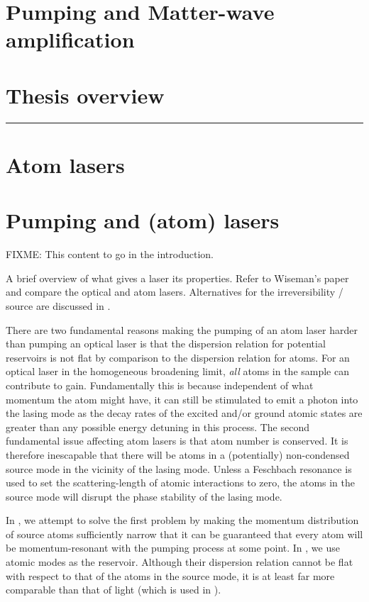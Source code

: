 \section{Pumping and Matter-wave amplification}

\section{Thesis overview}

\hrule

\section{Atom lasers}
\label{Introduction:AtomLaser}


\section{Pumping and (atom) lasers}
\label{Introduction:Pumping}

FIXME: This content to go in the introduction.

A brief overview of what gives a laser its properties. Refer to Wiseman's paper~\citep{Wiseman:1997ba} and compare the optical and atom lasers. Alternatives for the irreversibility / source are discussed in .

There are two fundamental reasons making the pumping of an atom laser harder than pumping an optical laser is that the dispersion relation for potential reservoirs is not flat by comparison to the dispersion relation for atoms.  For an optical laser in the homogeneous broadening limit, \emph{all} atoms in the sample can contribute to gain.  Fundamentally this is because independent of what momentum the atom might have, it can still be stimulated to emit a photon into the lasing mode as the decay rates of the excited and/or ground atomic states are greater than any possible energy detuning in this process.  The second fundamental issue affecting atom lasers is that atom number is conserved.  It is therefore inescapable that there will be atoms in a (potentially) non-condensed source mode in the vicinity of the lasing mode.  Unless a Feschbach resonance is used to set the scattering-length of atomic interactions to zero, the atoms in the source mode will disrupt the phase stability of the lasing mode.

In , we attempt to solve the first problem by making the momentum distribution of source atoms sufficiently narrow that it can be guaranteed that every atom will be momentum-resonant with the pumping process at some point.  In , we use atomic modes as the reservoir.  Although their dispersion relation cannot be flat with respect to that of the atoms in the source mode, it is at least far more comparable than that of light (which is used in ).

